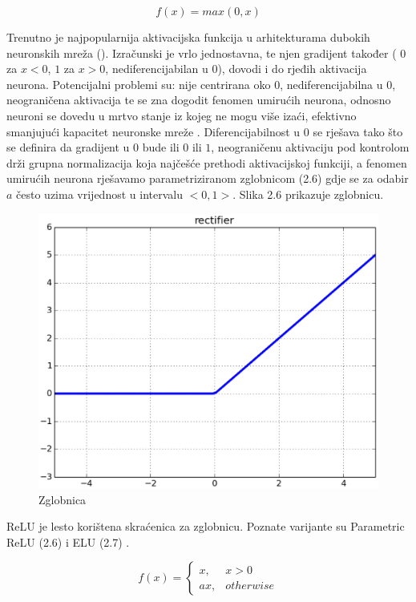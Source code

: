 \documentclass[times, utf8, diplomski]{fer}
\begin{document}
\begin{equation}
    f(x)=max(0,x)
\end{equation}

Trenutno je najpopularnija aktivacijska funkcija u arhitekturama dubokih neuronskih mreža (\cite{rect}). Izračunski je vrlo jednostavna, te njen gradijent također ( $0$ za $x<0$, $1$ za $x>0$, nediferencijabilan u $0$), dovodi i do rjeđih aktivacija neurona. Potencijalni problemi su: nije centrirana oko $0$, nediferencijabilna u $0$, neograničena aktivacija te se zna dogodit fenomen umirućih neurona, odnosno neuroni se dovedu u mrtvo stanje iz kojeg ne mogu više izaći, efektivno smanjujući kapacitet neuronske mreže \cite{rect}. Diferencijabilnost u $0$ se rješava tako što se definira da gradijent u $0$ bude ili $0$ ili $1$, neograničenu aktivaciju pod kontrolom drži grupna normalizacija koja najčešće prethodi aktivacijskoj funkciji, a fenomen umirućih neurona rješavamo parametriziranom zglobnicom (2.6) gdje se za odabir $a$ često uzima vrijednost u intervalu $<0, 1>$. Slika 2.6 prikazuje zglobnicu.

\begin{figure}[htbp]
    \centering
    \includegraphics[scale=0.5]{Slike/rect}
    \caption{Zglobnica \cite{rectpic}}
\end{figure}

ReLU je lesto korištena skraćenica za zglobnicu. Poznate varijante su Parametric ReLU (2.6) i ELU (2.7) \cite{rect}.

\begin{equation}
    f(x)=
    \begin{cases}
      x, & x > 0 \\
      ax, & otherwise
    \end{cases}
\end{equation}
\end{document}
